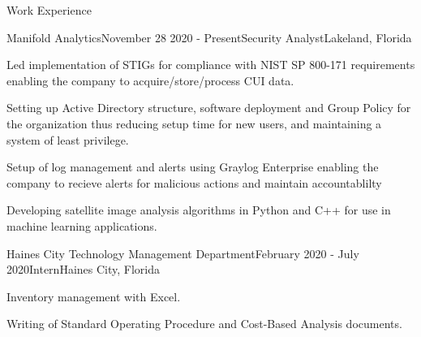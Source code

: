 \documentclass{resume} %
\begin{document}
\begin{rSection}{Work Experience}

	\begin{rSubsection}{Manifold Analytics}{November 28 2020 - Present}{Security Analyst}{Lakeland, Florida}
		\item Led implementation of STIGs for compliance with NIST SP 800-171 requirements enabling the company to acquire/store/process CUI data.
		\item Setting up Active Directory structure, software deployment and Group Policy for the organization thus reducing setup time for new users, and maintaining a system of least privilege.
		\item Setup of log management and alerts using Graylog Enterprise enabling the company to recieve alerts for malicious actions and maintain accountablilty
		\item Developing satellite image analysis algorithms in Python and C++ for use in machine learning applications.
	\end{rSubsection}
	
	\begin{rSubsection}{Haines City Technology Management Department}{February 2020 - July 2020}{Intern}{Haines City, Florida}
		\item Inventory management with Excel. 
		\item Writing of Standard Operating Procedure and Cost-Based Analysis documents.
	\end{rSubsection}
	
	

\end{rSection}
\end{document}
